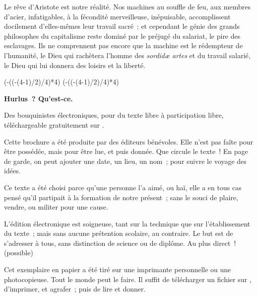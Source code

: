 \documentclass[french,twoside]{book} %
\newcommand\chapterclose{} %
\def\truncdiv#1#2{((#1-(#2-1)/2)/#2)}
\def\moduloop#1#2{(#1-\truncdiv{#1}{#2}*#2)}
\def\modulo#1#2{\number\numexpr\moduloop{#1}{#2}\relax}
\begin{document}
\noindent Le rêve d’Aristote est notre réalité. Nos machines au souffle de feu, aux membres d’acier, infatigables, à la fécondité merveilleuse, inépuisable, accomplissent docilement d’elles-mêmes leur travail sacré ; et cependant le génie des grands philosophes du capitalisme reste dominé par le préjugé du salariat, le pire des esclavages. Ils ne comprennent pas encore que la machine est le rédempteur de l’humanité, le Dieu qui rachètera l’homme des \emph{sordidæ artes} et du travail salarié, le Dieu qui lui donnera des loisirs et la liberté.
\chapterclose

 


\ifbooklet
  \pagestyle{empty}
  \clearpage
  \ifnum\modulo{\value{page}}{4}=0 \hbox{}\newpage\hbox{}\newpage\fi
  \ifnum\modulo{\value{page}}{4}=1 \hbox{}\newpage\hbox{}\newpage\fi


  \hbox{}\newpage
  \ifodd\value{page}\hbox{}\newpage\fi
  {\centering\color{rubric}\bfseries\noindent\large
    Hurlus ? Qu’est-ce.\par
    \bigskip
  }
  \noindent Des bouquinistes électroniques, pour du texte libre à participation libre,
  téléchargeable gratuitement sur \href{https://hurlus.fr}{}.\par
  \bigskip
  \noindent Cette brochure a été produite par des éditeurs bénévoles.
  Elle n’est pas faîte pour être possédée, mais pour être lue, et puis donnée.
  Que circule le texte !
  En page de garde, on peut ajouter une date, un lieu, un nom ; pour suivre le voyage des idées.
  \par

  Ce texte a été choisi parce qu’une personne l’a aimé,
  ou haï, elle a en tous cas pensé qu’il partipait à la formation de notre présent ;
  sans le souci de plaire, vendre, ou militer pour une cause.
  \par

  L’édition électronique est soigneuse, tant sur la technique
  que sur l’établissement du texte ; mais sans aucune prétention scolaire, au contraire.
  Le but est de s’adresser à tous, sans distinction de science ou de diplôme.
  Au plus direct ! (possible)
  \par

  Cet exemplaire en papier a été tiré sur une imprimante personnelle
   ou une photocopieuse. Tout le monde peut le faire.
  Il suffit de
  télécharger un fichier sur \href{https://hurlus.fr}{},
  d’imprimer, et agrafer ; puis de lire et donner.\par
\end{document}
